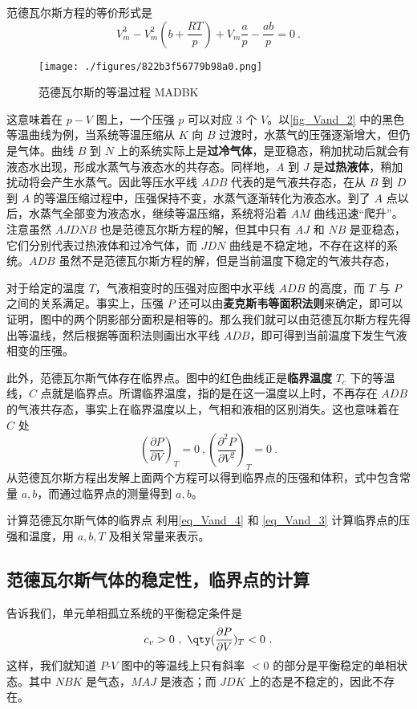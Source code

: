 范德瓦尔斯方程的等价形式是
\begin{equation}\label{eq_Vand_4}
V_m^3-V_m^2(b+\frac{RT}{p})+V_m\frac{a}{p}-\frac{ab}{p}=0~.
\end{equation}

\begin{figure}[ht]
\centering
\texttt{[image: ./figures/822b3f56779b98a0.png]}
\caption{范德瓦尔斯的等温过程 MADBK} \label{fig_Vand_2}
\end{figure}


这意味着在 $p-V$ 图上，一个压强 $p$ 可以对应 $3$ 个 $V$。以\autoref{fig_Vand_2} 中的黑色等温曲线为例，当系统等温压缩从 $K$ 向 $B$ 过渡时，水蒸气的压强逐渐增大，但仍是气体。曲线 $B$ 到 $N$ 上的系统实际上是\textbf{过冷气体}，是亚稳态，稍加扰动后就会有液态水出现，形成水蒸气与液态水的共存态。同样地，$A$ 到 $J$ 是\textbf{过热液体}，稍加扰动将会产生水蒸气。因此等压水平线 $ADB$ 代表的是气液共存态，在从 $B$ 到 $D$ 到 $A$ 的等温压缩过程中，压强保持不变，水蒸气逐渐转化为液态水。到了 $A$ 点以后，水蒸气全部变为液态水，继续等温压缩，系统将沿着 $AM$ 曲线迅速“爬升”。注意虽然 $AJDNB$ 也是范德瓦尔斯方程的解，但其中只有 $AJ$ 和 $NB$ 是亚稳态，它们分别代表过热液体和过冷气体，而 $JDN$ 曲线是不稳定地，不存在这样的系统。$ADB$ 虽然不是范德瓦尔斯方程的解，但是当前温度下稳定的气液共存态，

对于给定的温度 $T$，气液相变时的压强对应图中水平线 $ADB$ 的高度，而 $T$ 与 $P$ 之间的关系满足。事实上，压强 $P$ 还可以由\textbf{麦克斯韦等面积法则}来确定，即可以证明，图中的两个阴影部分面积是相等的。那么我们就可以由范德瓦尔斯方程先得出等温线，然后根据等面积法则画出水平线 $ADB$，即可得到当前温度下发生气液相变的压强。

此外，范德瓦尔斯气体存在临界点。图中的红色曲线正是\textbf{临界温度} $T_c$ 下的等温线，$C$ 点就是临界点。所谓临界温度，指的是在这一温度以上时，不再存在 $ADB$ 的气液共存态，事实上在临界温度以上，气相和液相的区别消失。这也意味着在 $C$ 处
\begin{equation}\label{eq_Vand_3}
\left(\frac{\partial P}{\partial V}\right)_T=0~,
\left(\frac{\partial^2 P}{\partial V^2}\right)_T=0~.
\end{equation}
从范德瓦尔斯方程出发解上面两个方程可以得到临界点的压强和体积，式中包含常量 $a,b$，而通过临界点的测量得到 $a,b$。
\begin{exercise}{计算范德瓦尔斯气体的临界点}
利用\autoref{eq_Vand_4} 和 \autoref{eq_Vand_3} 计算临界点的压强和温度，用 $a,b,T$ 及相关常量来表示。
\end{exercise}
\subsection{范德瓦尔斯气体的稳定性，临界点的计算}
告诉我们，单元单相孤立系统的平衡稳定条件是
\begin{equation}\label{eq_Vand_1}
c_v>0~,\ \qty(\frac{\partial P}{\partial V})_T<0~.
\end{equation}
这样，我们就知道 $P$-$V$ 图中的等温线上只有斜率 $<0$ 的部分是平衡稳定的单相状态。其中 $NBK$ 是气态，$MAJ$ 是液态；而 $JDK$ 上的态是不稳定的，因此不存在。

